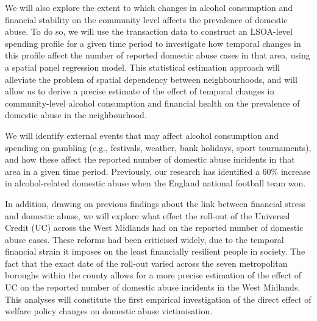 \documentclass[11pt, a4paper]{article}
\begin{document}



We will also explore the extent to which changes in alcohol consumption and financial stability on the community level affects the prevalence of domestic abuse. To do so, we will use the transaction data to construct an LSOA-level spending profile for a given time period to investigate how temporal changes in this profile affect the number of reported domestic abuse cases in that area, using a spatial panel regression model. This statistical estimation approach will alleviate the problem of spatial dependency between neighbourhoods, and will allow us to derive a precise estimate of the effect of temporal changes in community-level alcohol consumption and financial health on the prevalence of domestic abuse in the neighbourhood. 

We will identify external events that may affect alcohol consumption  and spending on gambling (e.g., festivals, weather, bank holidays, sport tournaments), and  how these affect the reported number of domestic abuse incidents in that area in a given time period. Previously, our research has identified a 60\% increase in alcohol-related domestic abuse when the England national football team won.


In addition, drawing on previous findings about the link between financial stress and domestic abuse, we will explore what effect the roll-out of the Universal Credit (UC) across the West Midlands had on the reported number of domestic abuse cases. These reforms had been criticised widely, due to the temporal financial strain it imposes on the least financially resilient people in society. The fact that the exact date of the roll-out varied across the seven metropolitan boroughs within the county allows for a more precise estimation of the effect of UC on the reported number of domestic abuse incidents in the West Midlands. This analyses will constitute the first empirical investigation of the direct effect of welfare policy changes on domestic abuse victimisation. 
\end{document}
